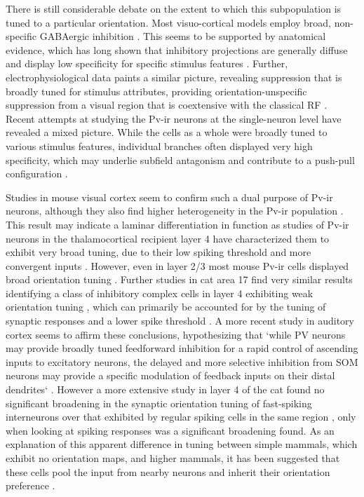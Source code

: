 There is still considerable debate on the extent to which this
subpopulation is tuned to a particular orientation. Most
visuo-cortical models employ broad, non-specific GABAergic inhibition
\citep{Somers1998,Troyer1998}. This seems to be supported by
anatomical evidence, which has long shown that inhibitory projections
are generally diffuse and display low specificity for specific
stimulus features \citep{Albus1994,Kisvarday1997a}. Further,
electrophysiological data paints a similar picture, revealing
suppression that is broadly tuned for stimulus attributes, providing
orientation-unspecific suppression from a visual region that is
coextensive with the classical RF \citep{DeAngelis1992}. Recent
attempts at studying the Pv-ir neurons at the single-neuron level have
revealed a mixed picture. While the cells as a whole were broadly
tuned to various stimulus features, individual branches often
displayed very high specificity, which may underlie subfield
antagonism and contribute to a push-pull configuration
\citep{Kisvarday2002}. 

Studies in mouse visual cortex seem to confirm such a dual purpose of
Pv-ir neurons, although they also find higher heterogeneity in the
Pv-ir population \citep{Runyan2010}. This result may indicate a
laminar differentiation in function as studies of Pv-ir neurons in the
thalamocortical recipient layer 4 have characterized them to exhibit
very broad tuning, due to their low spiking threshold and more
convergent inputs \citep{Ma2011}. However, even in layer 2/3 most
mouse Pv-ir cells displayed broad orientation tuning
\citep{Hofer2011}. Further studies in cat area 17 find very similar
results identifying a class of inhibitory complex cells in layer 4
exhibiting weak orientation tuning \citep{Hirsch2003}, which can
primarily be accounted for by the tuning of synaptic responses and a
lower spike threshold \citep{Nowak2008}.  A more recent study in
auditory cortex seems to affirm these conclusions, hypothesizing that
`while PV neurons may provide broadly tuned feedforward inhibition for
a rapid control of ascending inputs to excitatory neurons, the delayed
and more selective inhibition from SOM neurons may provide a specific
modulation of feedback inputs on their distal dendrites`
\citep{Li2014}. However a more extensive study in layer 4 of the cat
found no significant broadening in the synaptic orientation tuning of
fast-spiking interneurons over that exhibited by regular spiking cells
in the same region \citep{Cardin2007}, only when looking at spiking
responses was a significant broadening found. As an explanation of
this apparent difference in tuning between simple mammals, which
exhibit no orientation maps, and higher mammals, it has been suggested
that these cells pool the input from nearby neurons and inherit their
orientation preference \citep{Isaacson2011}.

